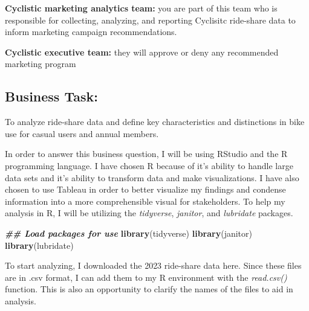 \documentclass[
]{article}
\newenvironment{Shaded}{\begin{snugshade}}{\end{snugshade}}
\newcommand{\DocumentationTok}[1]{\textcolor[rgb]{0.56,0.35,0.01}{\textbf{\textit{#1}}}}
\newcommand{\FunctionTok}[1]{\textcolor[rgb]{0.13,0.29,0.53}{\textbf{#1}}}
\newcommand{\NormalTok}[1]{#1}
\begin{document}
\textbf{Cyclistic marketing analytics team:} you are part of this team
who is responsible for collecting, analyzing, and reporting Cyclisitc
ride-share data to inform marketing campaign recommendations.

\textbf{Cyclistic executive team:} they will approve or deny any
recommended marketing program

\hypertarget{business-task}{%
\subsection{Business Task:}\label{business-task}}

To analyze ride-share data and define key characteristics and
distinctions in bike use for casual users and annual members.

In order to answer this business question, I will be using RStudio and
the R programming language. I have chosen R because of it's ability to
handle large data sets and it's ability to transform data and make
visualizations. I have also chosen to use Tableau in order to better
visualize my findings and condense information into a more
comprehensible visual for stakeholders. To help my analysis in R, I will
be utilizing the \emph{tidyverse}, \emph{janitor}, and \emph{lubridate}
packages.

\begin{Shaded}
\begin{Highlighting}[]
\DocumentationTok{\#\# Load packages for use}
\FunctionTok{library}\NormalTok{(tidyverse)}
\FunctionTok{library}\NormalTok{(janitor)}
\FunctionTok{library}\NormalTok{(lubridate)}
\end{Highlighting}
\end{Shaded}

To start analyzing, I downloaded the 2023 ride-share data here. Since
these files are in .csv format, I can add them to my R environment with
the \emph{read.csv()} function. This is also an opportunity to clarify
the names of the files to aid in analysis.
\end{document}
